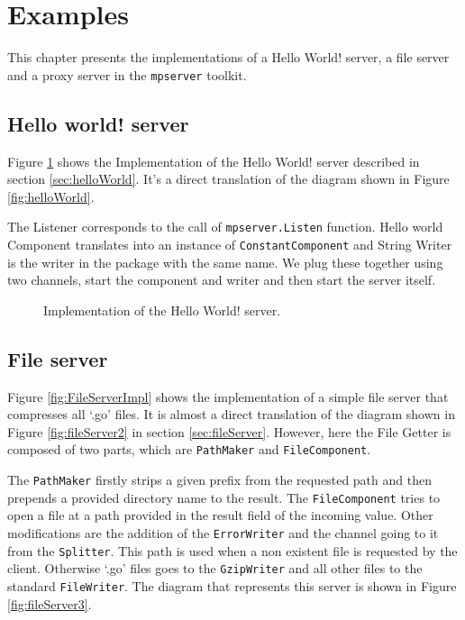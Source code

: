 \section{Examples}
\label{sec:examples}
This chapter presents the implementations of a Hello World! server,
a file server and a proxy server in the \texttt{mpserver} toolkit.

\subsection{Hello world! server}
Figure \ref{fig:HelloWorldImpl} shows the Implementation of the Hello World!
server described in section \ref{sec:helloWorld}.
It's a direct translation of the diagram shown in Figure \ref{fig:helloWorld}.

The Listener corresponds to the call of \texttt{mpserver.Listen} function.
Hello world Component translates into an instance of \texttt{ConstantComponent}
and String Writer is the writer in the package with the same name.
We plug these together using two channels, start the component and writer 
and then start the server itself.

\begin{figure}[h]
\centering

\caption[scale=1.0]{Implementation of the Hello World! server.}
\label{fig:HelloWorldImpl}
\end{figure}

\newpage
\subsection{File server}
Figure \ref{fig:FileServerImpl} shows the implementation of a simple 
file server that compresses all `.go' files. It is almost a direct translation
of the diagram shown in Figure \ref{fig:fileServer2} in section \ref{sec:fileServer}.
However, here the File Getter is composed of two parts, which are \texttt{PathMaker}
and \texttt{FileComponent}.

The \texttt{PathMaker} firstly strips a given
prefix from the requested path and then prepends a provided directory name to 
the result. The \texttt{FileComponent} tries to open a file at a path 
provided in the result field of the incoming value. Other modifications
are the addition of the \texttt{ErrorWriter} and the channel going to it from
the \texttt{Splitter}.
This path is used when a non existent file is requested by the client.
Otherwise `.go' files goes to the \texttt{GzipWriter} and all other files to 
the standard \texttt{FileWriter}.
The diagram that represents this server is shown in 
Figure \ref{fig:fileServer3}.

